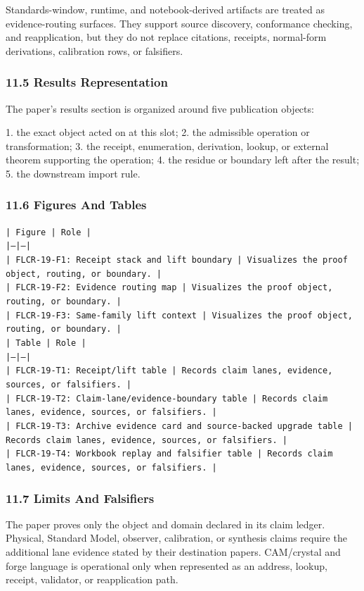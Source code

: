 \documentclass[11pt]{article}
\begin{document}
Standards-window, runtime, and notebook-derived artifacts are treated
as evidence-routing surfaces. They support source discovery, conformance
checking, and reapplication, but they do not replace citations, receipts,
normal-form derivations, calibration rows, or falsifiers.

\subsubsection*{11.5 Results Representation}

The paper's results section is organized around five publication objects:

1. the exact object acted on at this slot;
2. the admissible operation or transformation;
3. the receipt, enumeration, derivation, lookup, or external theorem supporting
   the operation;
4. the residue or boundary left after the result;
5. the downstream import rule.

\subsubsection*{11.6 Figures And Tables}

\noindent\texttt{| Figure | Role |}\\
\noindent\texttt{|---|---|}\\
\noindent\texttt{| FLCR-19-F1: Receipt stack and lift boundary | Visualizes the proof object, routing, or boundary. |}\\
\noindent\texttt{| FLCR-19-F2: Evidence routing map | Visualizes the proof object, routing, or boundary. |}\\
\noindent\texttt{| FLCR-19-F3: Same-family lift context | Visualizes the proof object, routing, or boundary. |}\\

\noindent\texttt{| Table | Role |}\\
\noindent\texttt{|---|---|}\\
\noindent\texttt{| FLCR-19-T1: Receipt/lift table | Records claim lanes, evidence, sources, or falsifiers. |}\\
\noindent\texttt{| FLCR-19-T2: Claim-lane/evidence-boundary table | Records claim lanes, evidence, sources, or falsifiers. |}\\
\noindent\texttt{| FLCR-19-T3: Archive evidence card and source-backed upgrade table | Records claim lanes, evidence, sources, or falsifiers. |}\\
\noindent\texttt{| FLCR-19-T4: Workbook replay and falsifier table | Records claim lanes, evidence, sources, or falsifiers. |}\\

\subsubsection*{11.7 Limits And Falsifiers}

The paper proves only the object and domain declared in its claim ledger.
Physical, Standard Model, observer, calibration, or synthesis claims require
the additional lane evidence stated by their destination papers. CAM/crystal
and forge language is operational only when represented as an address, lookup,
receipt, validator, or reapplication path.
\end{document}
